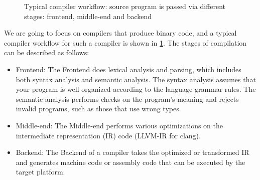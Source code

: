 \begin{figure}
  \begin{center}
  \end{center}
  \caption{Typical compiler workflow: source program is passed via different
    stages: frontend, middle-end and backend}
  \label{fig:compiler_workflow}
\end{figure}

We are going to focus on compilers that produce binary code, and a typical
compiler workflow for such a compiler is shown in
\cref{fig:compiler_workflow}. The stages of compilation can be described as
follows: 
\begin{itemize}
\item Frontend: The Frontend does lexical analysis and parsing, which includes
  both syntax analysis and semantic analysis. The syntax analysis assumes that
  your program is well-organized according to the language grammar rules. The
  semantic analysis performs checks on the program's meaning and rejects invalid
  programs, such as those that use wrong types. 
\item Middle-end: The Middle-end performs various optimizations on the
  intermediate representation (IR) code (LLVM-IR for clang). 
\item Backend: The Backend of a compiler takes the optimized or transformed
  IR and generates machine code or assembly code that can be executed by the
  target platform. 
\end{itemize} 

